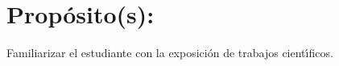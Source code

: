 \section{Prop\'{o}sito(s):}

Familiarizar el estudiante con la exposici\'{o}n de trabajos cient\'{\i}ficos.